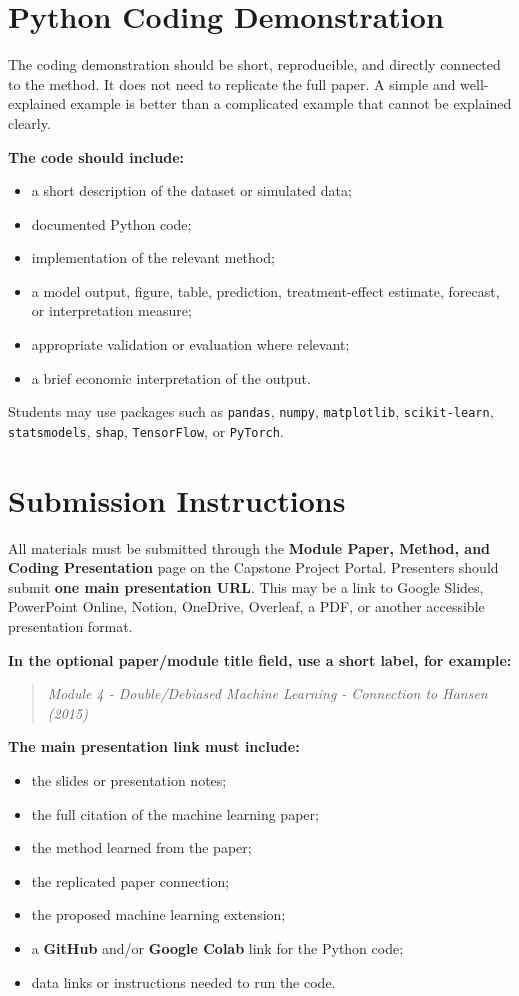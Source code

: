 \documentclass[11pt]{article}
\newcommand{\coloredsection}[1]{\vspace{2pt}\section*{\large\textcolor{sectioncolor}{#1}}\vspace{-2pt}}
\newcommand{\subhead}[1]{\vspace{4pt}\noindent\textbf{#1}}
\begin{document}
\coloredsection{Python Coding Demonstration}

The coding demonstration should be short, reproducible, and directly connected to the method. It does not need to replicate the full paper. A simple and well-explained example is better than a complicated example that cannot be explained clearly.

\subhead{The code should include:}
\begin{itemize}
    \item a short description of the dataset or simulated data;
    \item documented Python code;
    \item implementation of the relevant method;
    \item a model output, figure, table, prediction, treatment-effect estimate, forecast, or interpretation measure;
    \item appropriate validation or evaluation where relevant;
    \item a brief economic interpretation of the output.
\end{itemize}

\noindent Students may use packages such as \texttt{pandas}, \texttt{numpy}, \texttt{matplotlib}, \texttt{scikit-learn}, \texttt{statsmodels}, \texttt{shap}, \texttt{TensorFlow}, or \texttt{PyTorch}.

\coloredsection{Submission Instructions}

All materials must be submitted through the \textbf{Module Paper, Method, and Coding Presentation} page on the Capstone Project Portal. Presenters should submit \textbf{one main presentation URL}. This may be a link to Google Slides, PowerPoint Online, Notion, OneDrive, Overleaf, a PDF, or another accessible presentation format.

\subhead{In the optional paper/module title field, use a short label, for example:}
\begin{quote}
\textit{Module 4 - Double/Debiased Machine Learning - Connection to Hansen (2015)}
\end{quote}

\subhead{The main presentation link must include:}
\begin{itemize}
    \item the slides or presentation notes;
    \item the full citation of the machine learning paper;
    \item the method learned from the paper;
    \item the replicated paper connection;
    \item the proposed machine learning extension;
    \item a \textbf{GitHub} and/or \textbf{Google Colab} link for the Python code;
    \item data links or instructions needed to run the code.
\end{itemize}
\end{document}

